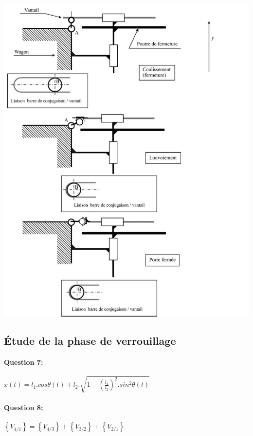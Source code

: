 \begin{center}
 \includegraphics[width=\linewidth]{img/DR3_cor}
\end{center}

\newpage

\subsection{Étude de la phase de verrouillage}

\paragraph{Question 7:}

$x(t)=l_1.cos\theta(t)+l_2.\sqrt{1-\left(\frac{l_1}{l_2}\right)^2.sin^2\theta(t)}$

\paragraph{Question 8:}

$\left\{V_{4/1}\right\}=\left\{V_{4/3}\right\}+\left\{V_{3/2}\right\}+\left\{V_{2/1}\right\}$

